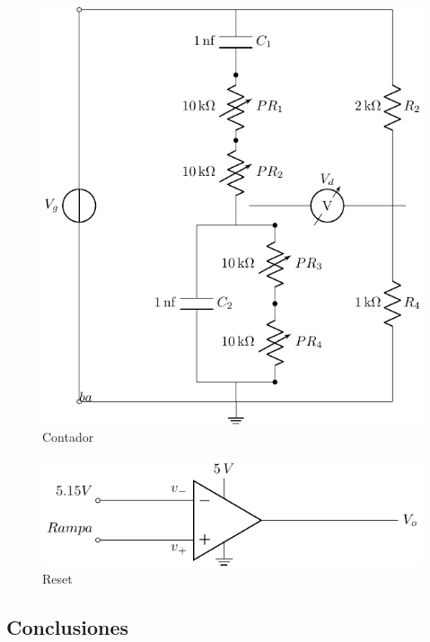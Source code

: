 \begin{figure}[H]
\centering
\includegraphics[scale=0.8]{Ejercicio8/Circuitos/Contador&Display.pdf}
\caption{Contador}
\label{fig:Contador&Display}
\end{figure}

\begin{figure}[H]
\centering
\includegraphics[scale=0.8]{Ejercicio8/Circuitos/Reset.pdf}
\caption{Reset}
\label{fig:Reset}
\end{figure}





\subsection{Conclusiones}